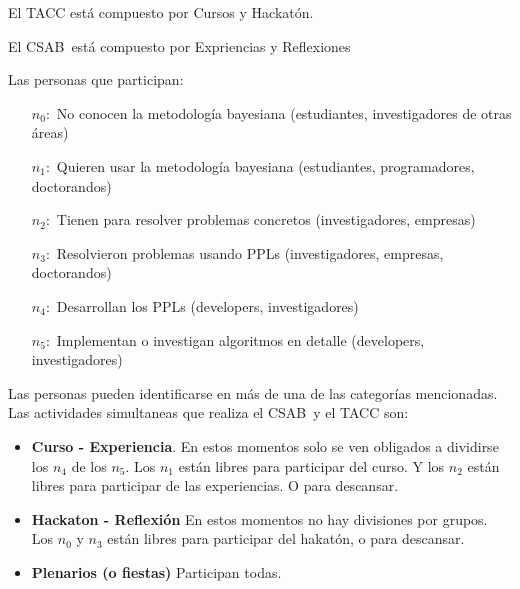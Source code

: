 \documentclass{article}
\newcommand{\congresoSigla}{CSAB}
\begin{document}
El TACC está compuesto por Cursos y Hackatón.

El \congresoSigla \ está compuesto por Expriencias y Reflexiones

\vspace{0.3cm} %

Las personas que participan:
%
\begin{itemize}\setlength\itemsep{-0.1cm}
\item[$n_0:$] No conocen la metodología bayesiana (estudiantes, investigadores de otras áreas) 
\item[$n_1:$] Quieren usar la metodología bayesiana (estudiantes, programadores, doctorandos) 
\item[$n_2:$] Tienen para resolver problemas concretos (investigadores, empresas) 
\item[$n_3:$] Resolvieron problemas usando PPLs (investigadores, empresas, doctorandos) 
\item[$n_4:$] Desarrollan los PPLs (developers, investigadores) 
\item[$n_5:$] Implementan o investigan algoritmos en detalle (developers, investigadores) 
\end{itemize}
%
Las personas pueden identificarse en más de una de las categorías mencionadas.
Las actividades simultaneas que realiza el \congresoSigla \ y el TACC son:

\begin{itemize}\setlength\itemsep{-0.1cm}
\item \textbf{Curso - Experiencia}. 
En estos momentos solo se ven obligados a dividirse los $n_4$ de los $n_5$.
Los $n_1$ están libres para participar del curso.
Y los $n_2$ están libres para participar de las experiencias.
O para descansar.

\item \textbf{Hackaton - Reflexión}
En estos momentos no hay divisiones por grupos.
Los $n_0$ y $n_3$ están libres para participar del hakatón, o para descansar.

\item \textbf{Plenarios (o fiestas)}
Participan todas.

\end{itemize}
\end{document}
